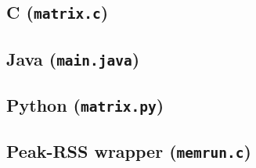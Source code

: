 \documentclass[11pt,a4paper]{article}
\begin{document}
\subsection{C (\texttt{matrix.c})}

\subsection{Java (\texttt{main.java})}

\subsection{Python (\texttt{matrix.py})}

\subsection{Peak-RSS wrapper (\texttt{memrun.c})}

\end{document}
